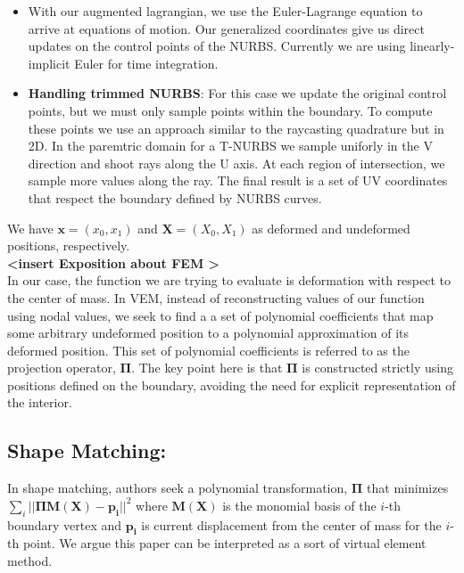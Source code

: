 \begin{itemize}
	\item With our augmented lagrangian, we use the Euler-Lagrange equation to arrive at equations of motion. Our generalized coordinates give us direct updates on the control points of the NURBS. Currently we are using linearly-implicit Euler for time integration.
	\item \textbf{Handling trimmed NURBS}: For this case we update the original control points, but we must only sample points within the boundary. To compute these points we use an approach similar to the raycasting quadrature but in 2D. In the paremtric domain for a T-NURBS we sample uniforly in the V direction and shoot rays along the U axis. At each region of intersection, we sample more values along the ray. The final result is a set of UV coordinates that respect the boundary defined by NURBS curves.
\end{itemize}



We have $\mathbf{x} = (x_0, x_1)$ and $\mathbf{X} = (X_0, X_1) $ as deformed and undeformed positions, respectively. \\

\textbf{<insert Exposition about FEM >} \\
In our case, the function we are trying to evaluate is deformation with respect to the center of mass. In VEM, instead of reconstructing values of our function using nodal values, we seek to find a a set of polynomial coefficients that map some arbitrary undeformed position to a polynomial approximation of its deformed position. This set of polynomial coefficients is referred to as the projection operator, $\mathbf{\Pi}$. The key point here is that $\mathbf{\Pi}$ is constructed strictly using positions defined on the boundary, avoiding the need for explicit representation of the interior. \\

\subsection{Shape Matching: }
In shape matching, authors seek a polynomial transformation, $\mathbf{\Pi}$ that minimizes $\sum_i ||\mathbf{\Pi}\mathbf{M(X)} - \mathbf{p_i}||^2$ where $\mathbf{M(X)}$ is the monomial basis of the $i$-th boundary vertex and $\mathbf{p_i}$ is current displacement from the center of mass for the $i$-th point. We argue this paper can be interpreted as a sort of virtual element method. \\

